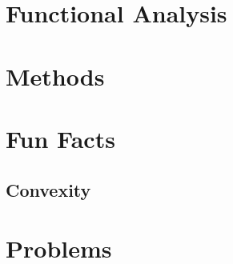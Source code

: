 \documentclass[12pt, oneside]{book}
\begin{document}
    \chapter{Functional Analysis}
    \chapter{Methods}
    \chapter{Fun Facts}
        \section{Convexity}
    \chapter{Problems}
\end{document}
